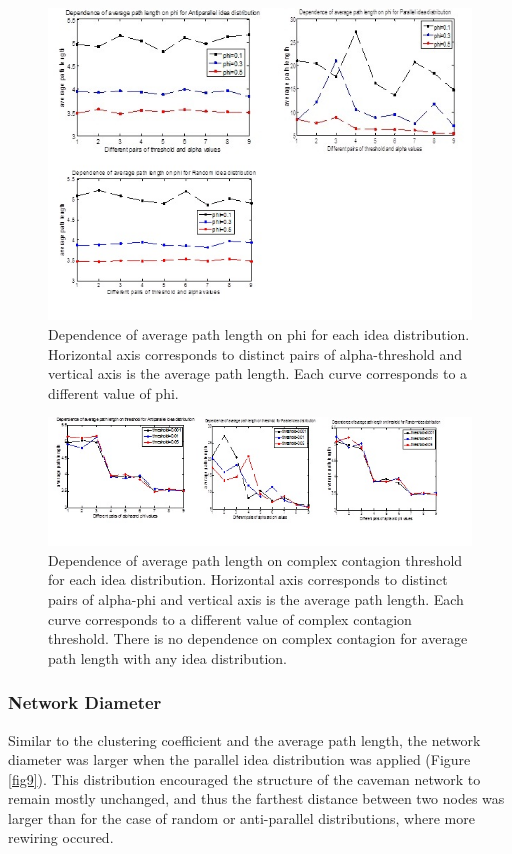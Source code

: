 \begin{figure}
[htp]
\begin{center}
\includegraphics{Fig14}
\end{center}
\caption {Dependence of average path length on phi for each idea distribution. Horizontal axis corresponds to distinct pairs of alpha-threshold and vertical axis is the average path length. Each curve corresponds to a different value of phi.}
\label {fig14}
\end{figure}


\begin{figure}
[htp]
\begin{center}
\includegraphics{Fig17}
\end{center}
\caption{ Dependence of average path length on complex contagion threshold for each idea distribution. Horizontal axis corresponds to distinct pairs of alpha-phi and vertical axis is the average path length. Each curve corresponds to a different value of complex contagion threshold. There is no dependence on complex contagion for average path length with any idea distribution.}
\label {fig17}
\end{figure}


\subsubsection{Network Diameter}
Similar to the clustering coefficient and the average path length, the network diameter was larger when the parallel idea distribution was applied (Figure \ref{fig9}). This distribution encouraged the structure of the caveman network to remain mostly unchanged, and thus the farthest distance between two nodes was larger than for the case of random or anti-parallel distributions, where more rewiring occured. 
